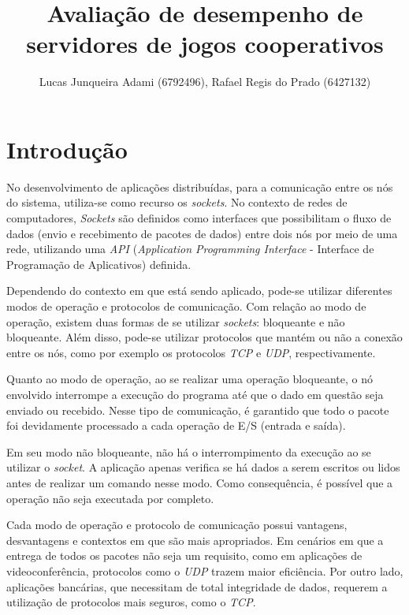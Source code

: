 \documentclass[12pt]{article}
\title{Avaliação de desempenho de servidores de jogos cooperativos}
\author{Lucas Junqueira Adami (6792496)\inst{1}, Rafael Regis do Prado (6427132)\inst{1}}
\begin{document}
 

\maketitle

\begin{resumo} %
\end{resumo}

\section{Introdução} \label{sec:introcao}

No desenvolvimento de aplicações distribuídas, para a comunicação entre os nós do sistema, utiliza-se como recurso os \emph{sockets}. No contexto de redes de computadores, \emph{Sockets} são definidos como interfaces que possibilitam o fluxo de dados (envio e recebimento de pacotes de dados) entre dois nós por meio de uma rede, utilizando uma \emph{API} (\emph{Application Programming Interface} - Interface de Programação de Aplicativos) definida.

Dependendo do contexto em que está sendo aplicado, pode-se utilizar diferentes modos de operação e protocolos de comunicação. Com relação ao modo de operação, existem duas formas de se utilizar \emph{sockets}: bloqueante e não bloqueante. Além disso, pode-se utilizar protocolos que mantém ou não a conexão entre os nós, como por exemplo os protocolos \emph{TCP} e \emph{UDP}, respectivamente.

Quanto ao modo de operação, ao se realizar uma operação bloqueante, o nó envolvido interrompe a execução do programa até que o dado em questão seja enviado ou recebido. Nesse tipo de comunicação, é garantido que todo o pacote foi devidamente processado a cada operação de E/S (entrada e saída).

Em seu modo não bloqueante, não há o interrompimento da execução ao se utilizar o \emph{socket}. A aplicação apenas verifica se há dados a serem escritos ou lidos antes de realizar um comando nesse modo. Como consequência, é possível que a operação não seja executada por completo. 

Cada modo de operação e protocolo de comunicação possui vantagens, desvantagens e contextos em que são mais apropriados. Em cenários em que a entrega de todos os pacotes não seja um requisito, como em aplicações de videoconferência, protocolos como o \emph{UDP} trazem maior eficiência. Por outro lado, aplicações bancárias, que necessitam de total integridade de dados, requerem a utilização de protocolos mais seguros, como o \emph{TCP}.
\end{document}
